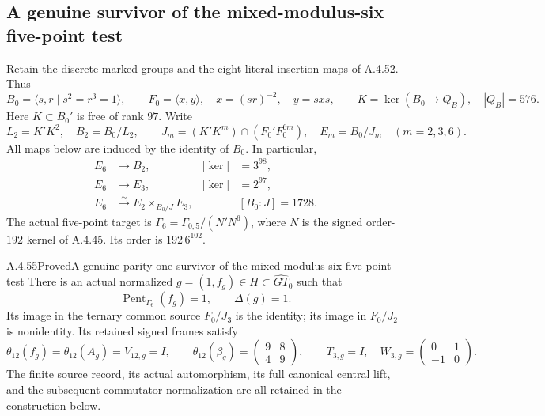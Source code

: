 \subsection{A genuine survivor of the mixed-modulus-six five-point test}

Retain the discrete marked groups and the eight literal insertion maps
of A.4.52.  Thus
\[
 B_0=\langle s,r\mid s^2=r^3=1\rangle,\qquad
 F_0=\langle x,y\rangle,\quad x=(sr)^{-2},\quad y=sxs,
 \qquad K=\ker(B_0\longrightarrow Q_B),\quad |Q_B|=576.
 \tag{CMC.1}
\]
Here $K\subset B_0'$ is free of rank $97$.  Write
\[
 L_2=K'K^2,\quad B_2=B_0/L_2,\qquad
 J_m=(K'K^m)\cap(F_0'F_0^{6m}),\quad E_m=B_0/J_m
 \quad(m=2,3,6).
 \tag{CMC.2}
\]
All maps below are induced by the identity of $B_0$.  In particular,
\[
 \begin{aligned}
 E_6&\longrightarrow B_2,& |\ker|&=3^{98},\\
 E_6&\longrightarrow E_3,& |\ker|&=2^{97},\\
 E_6&\xrightarrow{\sim} E_2\mathop{\times}_{B_0/J}E_3,
 &&[B_0:J]=1728.
 \end{aligned}
 \tag{CMC.3}
\]
The actual five-point target is
$\Gamma_6=\Gamma_{0,5}/(N'N^6)$, where $N$ is the signed
order-$192$ kernel of A.4.45.  Its order is $192\,6^{102}$.

\begin{result}{A.4.55}{Proved}{A genuine parity-one survivor of the mixed-modulus-six five-point test}
There is an actual normalized $g=(1,f_g)\in H\subset\widehat{GT}_0$
such that
\[
 \operatorname{Pent}_{\Gamma_6}(f_g)=1,\qquad
 \Delta(g)=1.
 \tag{CMC.4}
\]
Its image in the ternary common source $F_0/J_3$ is the identity;
its image in $F_0/J_2$ is nonidentity.  Its retained signed frames satisfy
\[
 \theta_{12}(f_g)=\theta_{12}(A_g)=V_{12,g}=I,
 \qquad
 \theta_{12}(\beta_g)=
 \begin{pmatrix}9&8\\4&9\end{pmatrix},
 \qquad T_{3,g}=I,\quad
 W_{3,g}=\begin{pmatrix}0&1\\-1&0\end{pmatrix}.
 \tag{CMC.5}
\]
The finite source record, its actual automorphism, its full canonical
central lift, and the subsequent commutator normalization are all retained
in the construction below.
\end{result}

